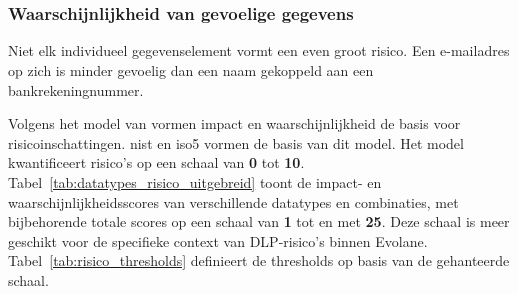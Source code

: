 

\section{}
\label{sec:data_risico}

\subsubsection{Waarschijnlijkheid van gevoelige gegevens}
Niet elk individueel gegevenselement vormt een even groot risico. Een e-mailadres op zich is minder gevoelig dan een naam gekoppeld aan een bankrekeningnummer. 


Volgens het model van \textcite{AlFikri2019} vormen impact en waarschijnlijkheid de basis voor risico\-inschattingen. 
\gls{nist} \autocite{NIST800-30} en \gls{iso5} \autocite{IOSIEC2022} vormen de basis van dit model.
Het model kwantificeert risico's op een schaal van \textbf{0} tot \textbf{10}. 
Tabel~\ref{tab:datatypes_risico_uitgebreid} toont de impact- en waarschijnlijkheidsscores van verschillende datatypes en combinaties, 
met bijbehorende totale scores op een schaal van \textbf{1} tot en met \textbf{25}.
Deze schaal is meer geschikt voor de specifieke context van DLP-risico's binnen Evolane.
Tabel~\ref{tab:risico_thresholds} definieert de thresholds op basis van de gehanteerde schaal.

